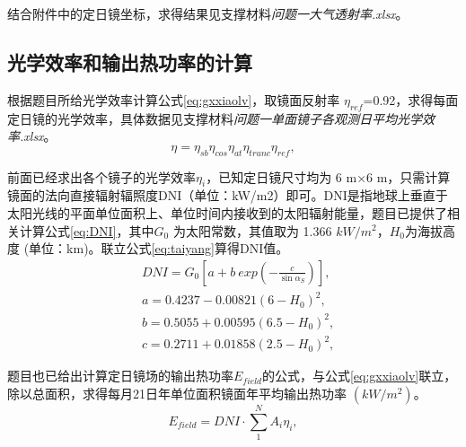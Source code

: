 \documentclass[withoutpreface,bwprint]{cumcmthesis}
\begin{document}
		结合附件中的定日镜坐标，求得结果见支撑材料\textit{问题一大气透射率.xlsx}。
		
		\subsection{光学效率和输出热功率的计算}
		根据题目所给光学效率计算公式\cref{eq:gxxiaolv}，取镜面反射率 $\eta_{ref}$=0.92，求得每面定日镜的光学效率，具体数据见支撑材料\textit{问题一单面镜子各观测日平均光学效率.xlsx}。
		\begin{equation}
		\eta =\eta_{sb}\eta_{cos}\eta_{at}\eta_{trunc}\eta_{ref},
		\label{eq:gxxiaolv}
		\end{equation}
		
		前面已经求出各个镜子的光学效率$\eta_i$，已知定日镜尺寸均为 6 m×6 m，只需计算镜面的法向直接辐射辐照度DNI（单位：kW/m2）即可。DNI是指地球上垂直于太阳光线的平面单位面积上、单位时间内接收到的太阳辐射能量，题目已提供了相关计算公式\cref{eq:DNI}，其中$G_0$ 为太阳常数，其值取为 1.366 $kW/m^2$，$H_0$为海拔高度 (单位：km)。联立公式\cref{eq:taiyang}算得DNI值。
		\begin{equation}
		\begin{aligned}		
		&DNI = G_0 [a + b \ exp (−\frac{c}{\sin \alpha_S})],\\
		&a=0.4237-0.00821(6-H_0)^2,\\
		&b=0.5055+0.00595(6.5-H_0)^2,\\
		&c=0.2711+0.01858(2.5-H_0)^2,
		\end{aligned}
		\label{eq:DNI}
		\end{equation}
		
		题目也已给出计算定日镜场的输出热功率$E_{field}$的公式，与公式\cref{eq:gxxiaolv}联立，除以总面积，求得每月21日年单位面积镜面年平均输出热功率 $(kW/m^2)$。
		\begin{equation}
		E_{field}=DNI·\sum_{1}^{N}A_i\eta_i,
		\end{equation}		
		
\end{document}
